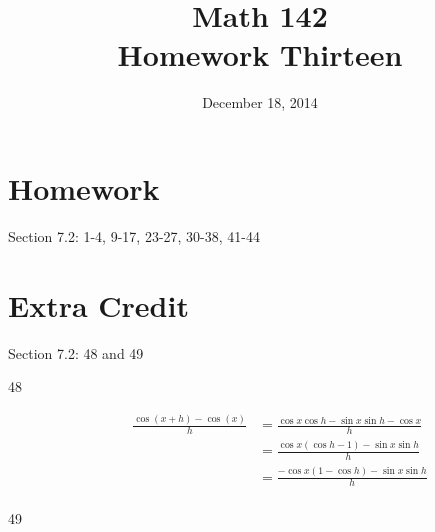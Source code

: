 \documentclass{exam}
\author{}
\date{December 18, 2014}
\title{Math 142 \\ Homework Thirteen}
\newcommand{\dg}{\ensuremath{^\circ}}
\begin{document}
  \maketitle

  \section{Homework}
  Section 7.2: 1-4, 9-17, 23-27, 30-38, 41-44

  \section{Extra Credit}
  Section 7.2: 48 and 49

  \ifprintanswers
    \pagebreak
    \begin{description}

      \item[48]
        \begin{align*}
          \frac{\cos(x + h) - \cos(x)}{h} & = \frac{\cos x \cos h - \sin x \sin h - \cos x}{h} \\
                                          & = \frac{\cos x (\cos h - 1) - \sin x \sin h}{h} \\
                                          & = \frac{- \cos x (1 - \cos h) - \sin x \sin h}{h} \\
        \end{align*}

      \item[49]

    \end{description}
\end{document}
